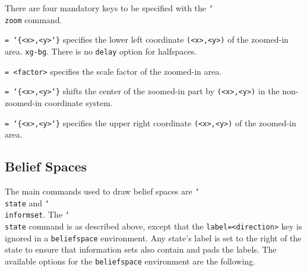 \documentclass{article}
\newenvironment{desc}{\itemize[leftmargin=50pt]}{\enditemize}
\def\option#1#2{\item[\texttt{#1}] \hskip-1.5pt\texttt{#2}}
\renewcommand{\textbackslash}{\char`\\}
\def\cmd#1{\texttt{\color{cmd}\textbackslash#1}}
\def\leftbrace{\char`\{}
\def\rightbrace{\char`\}}
\def\arg#1{{\color{cmd}\leftbrace}{\color{black}#1}{\color{cmd}\rightbrace}}
\begin{document}
There are four mandatory keys to be specified with the \cmd{zoom} command. 

\begin{desc}
\option{l}{= \arg{<x>,<y>}} specifies the lower left coordinate \texttt{(<x>,<y>)} of the zoomed-in area. \texttt{xg-bg}. There is no \texttt{delay} option for halfspaces.
\option{scale}{= <factor>} specifies the scale factor of the zoomed-in area.
\option{shift}{= \arg{<x>,<y>}} shifts the center of the zoomed-in part by \texttt{(<x>,<y>)} in the non-zoomed-in coordinate system. 
\option{u}{= \arg{<x>,<y>}} specifies the upper right coordinate \texttt{(<x>,<y>)} of the zoomed-in area.
\end{desc}

 


\subsection{Belief Spaces}

The main commands used to draw belief spaces are \cmd{state} and \cmd{informset}. The \cmd{state} command is as described above, except that the \texttt{label=<direction>} key is ignored in a \texttt{beliefspace} environment. Any state's label is set to the right of the state to ensure that information sets also contain and pads the labels. The available options for the \texttt{beliefspace} environment are the following.
\end{document}
